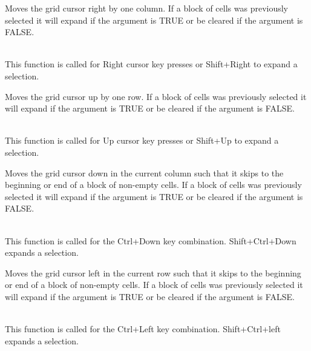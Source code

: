 \label{wxgridmovecursorright}


Moves the grid cursor right by one column. If a block of cells was previously selected it
will expand if the argument is TRUE or be cleared if the argument is FALSE.

\\
This function is called for Right cursor key presses or Shift+Right to expand a selection.

\label{wxgridmovecursorup}


Moves the grid cursor up by one row. If a block of cells was previously selected it
will expand if the argument is TRUE or be cleared if the argument is FALSE.

\\
This function is called for Up cursor key presses or Shift+Up to expand a selection.

\label{wxgridmovecursordownblock}


Moves the grid cursor down in the current column such that it skips to the beginning or
end of a block of non-empty cells. If a block of cells was previously selected it
will expand if the argument is TRUE or be cleared if the argument is FALSE.

\\
This function is called for the Ctrl+Down key combination. Shift+Ctrl+Down expands a selection.

\label{wxgridmovecursorleftblock}


Moves the grid cursor left in the current row such that it skips to the beginning or
end of a block of non-empty cells. If a block of cells was previously selected it
will expand if the argument is TRUE or be cleared if the argument is FALSE.

\\
This function is called for the Ctrl+Left key combination. Shift+Ctrl+left expands a selection.

